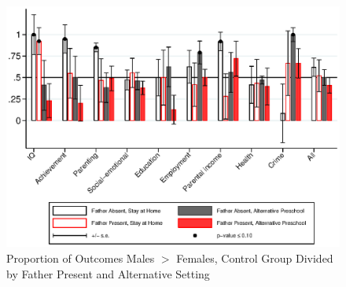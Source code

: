 \begin{figure}
\centering
\caption{Proportion of Outcomes Males $>$ Females, Control Group Divided by Father Present and Alternative Setting}
\includegraphics[width=\textwidth]{output/gendergaps-control-moderated-altpre-fhome}
\end{figure}



